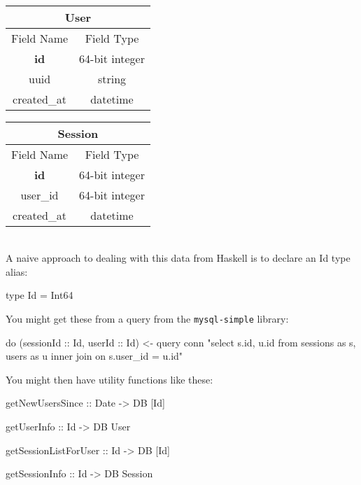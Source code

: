 \documentclass{tmr}
\begin{document}
~\\

\begin{minipage}[c]{0.45\textwidth}
    \begin{tabular}{cc}
\multicolumn{2}{c}{User}\\ \hline
Field Name & Field Type \\ \hline
\textbf{id} & 64-bit integer \\
uuid & string \\
created\_at & datetime \\ \hline
\end{tabular}
\end{minipage}
\begin{minipage}[c]{0.45\textwidth}
\begin{tabular}{cc}
\multicolumn{2}{c}{Session}\\ \hline
Field Name & Field Type \\ \hline
\textbf{id} & 64-bit integer \\
user\_id & 64-bit integer \\
created\_at & datetime \\ \hline
\end{tabular}
\end{minipage}

~\\

A naive approach to dealing with this data from Haskell is to declare an Id type alias:

\begin{code}
type Id = Int64
\end{code}

You might get these from a query from the \texttt{mysql-simple} library:

\begin{code}
do (sessionId :: Id, userId :: Id) <- query conn "select s.id, u.id
      from sessions as s, users as u inner join on s.user_id = u.id"
\end{code}

You might then have utility functions like these:

\begin{code}
getNewUsersSince :: Date -> DB [Id]

getUserInfo :: Id -> DB User

getSessionListForUser :: Id -> DB [Id]

getSessionInfo :: Id -> DB Session
\end{code}
\end{document}
